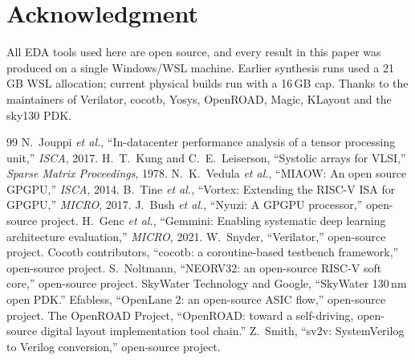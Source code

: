 \documentclass[conference]{IEEEtran}
\begin{document}
\section*{Acknowledgment}
All EDA tools used here are open source, and every result in this paper was
produced on a single Windows/WSL machine. Earlier synthesis runs used a
21\,GB WSL allocation; current physical builds run with a 16\,GB cap. Thanks
to the maintainers of Verilator, cocotb, Yosys, OpenROAD, Magic, KLayout and the
sky130 PDK.

\begin{thebibliography}{99}
 N.~Jouppi \emph{et al.}, ``In-datacenter performance analysis of a
tensor processing unit,'' \emph{ISCA}, 2017.
 H.~T.~Kung and C.~E.~Leiserson, ``Systolic arrays for VLSI,''
\emph{Sparse Matrix Proceedings}, 1978.
 N.~K.~Vedula \emph{et al.}, ``MIAOW: An open source GPGPU,''
\emph{ISCA}, 2014.
 B.~Tine \emph{et al.}, ``Vortex: Extending the RISC-V ISA for
GPGPU,'' \emph{MICRO}, 2017.
 J.~Bush \emph{et al.}, ``Nyuzi: A GPGPU processor,''
open-source project.
 H.~Genc \emph{et al.}, ``Gemmini: Enabling systematic deep
learning architecture evaluation,'' \emph{MICRO}, 2021.
 W.~Snyder, ``Verilator,'' open-source project.
 Cocotb contributors, ``cocotb: a coroutine-based testbench
framework,'' open-source project.
 S.~Noltmann, ``NEORV32: an open-source RISC-V soft core,''
open-source project.
 SkyWater Technology and Google, ``SkyWater 130\,nm open PDK.''
 Efabless, ``OpenLane 2: an open-source ASIC flow,''
open-source project.
 The OpenROAD Project, ``OpenROAD: toward a
self-driving, open-source digital layout implementation tool chain.''
 Z.~Smith, ``sv2v: SystemVerilog to Verilog conversion,''
open-source project.
\end{thebibliography}
\end{document}

